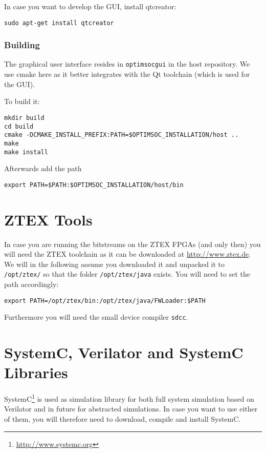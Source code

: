 In case you want to develop the GUI, install qtcreator:

\begin{lstlisting}
sudo apt-get install qtcreator
\end{lstlisting}

\subsubsection{Building}

The graphical user interface resides in \verb|optimsocgui| in the host
repository. We use cmake here as it better integrates with the Qt
toolchain (which is used for the GUI).

To build it:

\begin{lstlisting}
mkdir build
cd build
cmake -DCMAKE_INSTALL_PREFIX:PATH=$OPTIMSOC_INSTALLATION/host ..
make
make install
\end{lstlisting}

Afterwards add the path

\begin{lstlisting}
export PATH=$PATH:$OPTIMSOC_INSTALLATION/host/bin
\end{lstlisting}

\section{ZTEX Tools}

In case you are running the bitstreams on the ZTEX FPGAs (and only
then) you will need the ZTEX toolchain as it can be downloaded at
\url{http://www.ztex.de}. We will in the following assume you
downloaded it and unpacked it to \verb|/opt/ztex/| so that the folder
\verb|/opt/ztex/java| exists. You will need to set the path
accordingly:

\begin{lstlisting}
export PATH=/opt/ztex/bin:/opt/ztex/java/FWLoader:$PATH
\end{lstlisting}

Furthermore you will need the small device compiler \verb|sdcc|.

\section{SystemC, Verilator and SystemC Libraries}

SystemC\footnote{\url{http://www.systemc.org}} is used as simulation
library for both full system simulation based on Verilator and in
future for abstracted simulations. In case you want to use either of
them, you will therefore need to download, compile and install
SystemC.

